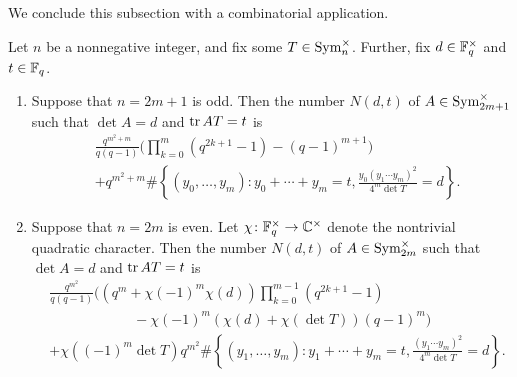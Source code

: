 We conclude this subsection with a combinatorial application.
\begin{corollary} \label{cor:count-sym}
    Let $n$ be a nonnegative integer, and fix some $T\in\operatorname{Sym}_n^\times$. Further, fix $d\in\mathbb F_q^\times$ and $t\in\mathbb F_q$.
    \begin{enumerate}[label=(\alph*)]
        \item Suppose that $n=2m+1$ is odd. Then the number $N(d,t)$ of $A\in\operatorname{Sym}_{2m+1}^\times$ such that $\det A=d$ and $\operatorname{tr} AT=t$ is
        \begin{align*}
            &\frac{q^{m^2+m}}{q(q-1)}\Bigg(\prod_{k=0}^m\left(q^{2k+1}-1\right)-(q-1)^{m+1}\Bigg) \\
            &+q^{m^2+m}\#\left\{(y_0,\ldots,y_m):y_0+\cdots+y_m=t,\frac{y_0(y_1\cdots y_m)^2}{4^m\det T}=d\right\}.
        \end{align*}
        \item Suppose that $n=2m$ is even. Let $\chi\colon\mathbb F_q^\times\to\mathbb C^\times$ denote the nontrivial quadratic character. Then the number $N(d,t)$ of $A\in\operatorname{Sym}_{2m}^\times$ such that $\det A=d$ and $\operatorname{tr} AT=t$ is
        \begin{align*}
            &\frac{q^{m^2}}{q(q-1)}\Bigg(\left(q^m+\chi(-1)^m\chi(d)\right)\prod_{k=0}^{m-1}\left(q^{2k+1}-1\right) \\
            & \qquad\qquad\qquad-\chi(-1)^m\left(\chi(d)+\chi(\det T)\right)(q-1)^m\Bigg) \\
            &+\chi((-1)^m\det T)q^{m^2}\#\left\{(y_1,\ldots,y_m):y_1+\cdots+y_m=t,\frac{(y_1\cdots y_m)^2}{4^m\det T}=d\right\}.
        \end{align*}
    \end{enumerate}
\end{corollary}
